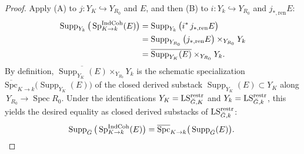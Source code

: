 \begin{proof}
Apply (A) to $j:Y_K\hookrightarrow Y_{R_0}$ and $E$, and then (B) to $i:Y_k\hookrightarrow Y_{R_0}$ and $j_{*,\mathrm{ren}}E$:
\[
\begin{aligned}
\operatorname{Supp}_{Y_k}\big(\operatorname{Sp}^{\mathrm{IndCoh}}_{K\to k}(E)\big)
&=\operatorname{Supp}_{Y_k}\big(i^*\,j_{*,\mathrm{ren}}E\big)\\
&=\operatorname{Supp}_{Y_{R_0}}\big(j_{*,\mathrm{ren}}E\big)\times_{Y_{R_0}} Y_k\\
&=\overline{\operatorname{Supp}_{Y_K}(E)}\times_{Y_{R_0}} Y_k.
\end{aligned}
\]
By definition, $\overline{\operatorname{Supp}_{Y_K}(E)}\times_{Y_{R_0}} Y_k$ is the schematic specialization $\overline{\mathrm{Spc}}_{K\to k}\big(\operatorname{Supp}_{Y_K}(E)\big)$ of the closed derived substack $\operatorname{Supp}_{Y_K}(E)\subset Y_K$ along $\,Y_{R_0}\to\operatorname{Spec} R_0$. Under the identifications $Y_K=\mathrm{LS}^{\mathrm{restr}}_{\breve G,K}$ and $Y_k=\mathrm{LS}^{\mathrm{restr}}_{\breve G,k}$, this yields the desired equality as closed derived substacks of $\mathrm{LS}^{\mathrm{restr}}_{\breve G,k}$:
\begin{equation*}
\operatorname{Supp}_{\breve G}\big(\operatorname{Sp}^{\mathrm{IndCoh}}_{K\to k}(E)\big)
=\overline{\mathrm{Spc}}_{K\to k}\big(\operatorname{Supp}_{\breve G}(E)\big).\;\qedhere
\end{equation*}
\end{proof}
